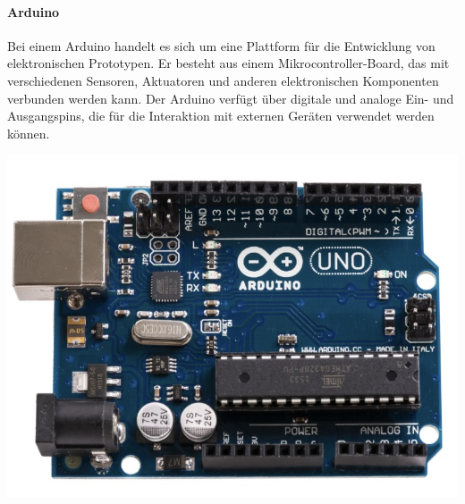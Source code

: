 \begin{minipage}{0.7\textwidth}
	\paragraph{Arduino}
	Bei einem Arduino handelt es sich um eine Plattform für die Entwicklung von elektronischen Prototypen. Er besteht aus
	einem Mikrocontroller-Board, das mit verschiedenen Sensoren, Aktuatoren und anderen elektronischen Komponenten
	verbunden werden kann. Der Arduino verfügt über digitale und analoge Ein- und Ausgangspins, die für die Interaktion mit
	externen Geräten verwendet werden können.
\end{minipage}
\begin{minipage}{0.3\textwidth}
	\includegraphics [width=\textwidth] {img/ArduinoR3}
\end{minipage}
\newline

